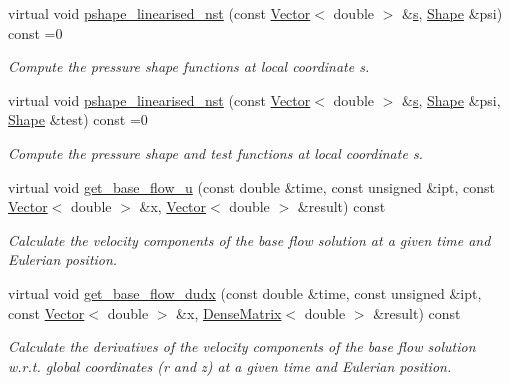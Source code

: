 \begin{DoxyCompactItemize}
virtual void \hyperlink{classoomph_1_1LinearisedNavierStokesEquations_a6158d0cdb646491170e4b75abfc88538}{pshape\+\_\+linearised\+\_\+nst} (const \hyperlink{classoomph_1_1Vector}{Vector}$<$ double $>$ \&\hyperlink{cfortran_8h_ab7123126e4885ef647dd9c6e3807a21c}{s}, \hyperlink{classoomph_1_1Shape}{Shape} \&psi) const =0
\begin{DoxyCompactList}\small\item\em Compute the pressure shape functions at local coordinate s. \end{DoxyCompactList}\item 
virtual void \hyperlink{classoomph_1_1LinearisedNavierStokesEquations_a10130c3d5e96459201ef87b196427c60}{pshape\+\_\+linearised\+\_\+nst} (const \hyperlink{classoomph_1_1Vector}{Vector}$<$ double $>$ \&\hyperlink{cfortran_8h_ab7123126e4885ef647dd9c6e3807a21c}{s}, \hyperlink{classoomph_1_1Shape}{Shape} \&psi, \hyperlink{classoomph_1_1Shape}{Shape} \&test) const =0
\begin{DoxyCompactList}\small\item\em Compute the pressure shape and test functions at local coordinate s. \end{DoxyCompactList}\item 
virtual void \hyperlink{classoomph_1_1LinearisedNavierStokesEquations_a7c219a316dbe67ef01f8c5b666e0c9ae}{get\+\_\+base\+\_\+flow\+\_\+u} (const double \&time, const unsigned \&ipt, const \hyperlink{classoomph_1_1Vector}{Vector}$<$ double $>$ \&x, \hyperlink{classoomph_1_1Vector}{Vector}$<$ double $>$ \&result) const
\begin{DoxyCompactList}\small\item\em Calculate the velocity components of the base flow solution at a given time and Eulerian position. \end{DoxyCompactList}\item 
virtual void \hyperlink{classoomph_1_1LinearisedNavierStokesEquations_ab4b45c111571d3904985dcefcae8ef67}{get\+\_\+base\+\_\+flow\+\_\+dudx} (const double \&time, const unsigned \&ipt, const \hyperlink{classoomph_1_1Vector}{Vector}$<$ double $>$ \&x, \hyperlink{classoomph_1_1DenseMatrix}{Dense\+Matrix}$<$ double $>$ \&result) const
\begin{DoxyCompactList}\small\item\em Calculate the derivatives of the velocity components of the base flow solution w.\+r.\+t. global coordinates (r and z) at a given time and Eulerian position. \end{DoxyCompactList}\item 

\end{DoxyCompactItemize}
